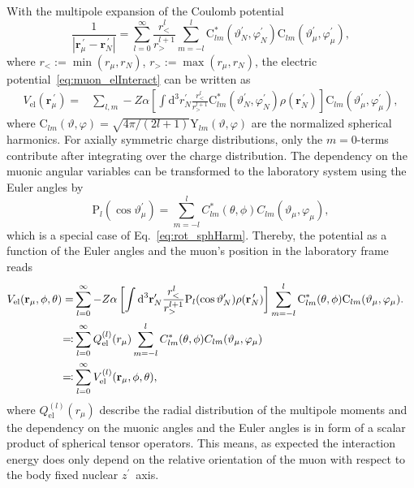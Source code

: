 With the multipole expansion of the Coulomb potential~\cite{jackson1999}
\begin{equation}
\frac{1}{|\mathbf{r}_\mu^{\,\prime}-\mathbf{r}_N^{\,\prime}|}=\sum_{l=0}^\infty \frac{r_<^l}{r_>^{l+1}}\sum_{m=-l}^l  \text{C}^*_{lm}(\vartheta_N^{\prime},\varphi_N^{\prime})\text{C}_{lm}(\vartheta_\mu^\prime,\varphi_\mu^\prime),
\end{equation}
where $r_<:=\min (r_\mu,r_N)$, $r_>:=\max (r_\mu,r_N)$, the electric potential~\eqref{eq:muon_elInteract} can be written as
\begin{align}
V_{\text{el}}(\mathbf{r}_\mu^{\,\prime})=&\sum_{l,m}-Z\alpha \left[ \int \text{d}^3r^{\prime}_N \frac{r_<^l}{r_>^{l+1}}\text{C}^*_{lm}(\vartheta_N^{\prime},\varphi_N^{\prime})\rho(\mathbf{r}_N^{\,\prime})\right]\text{C}_{lm}(\vartheta_\mu^{\prime},\varphi_\mu^\prime),
\end{align}
where ${\text{C}_{lm}(\vartheta,\varphi)}{=}{\sqrt{4\pi/(2l+1)}\text{Y}_{lm}(\vartheta,\varphi)}$ are the normalized spherical harmonics.
For axially symmetric charge distributions, only the ${m}{=}{0}$-terms contribute after integrating over the charge distribution. The dependency on the muonic angular variables can be transformed to the laboratory system using the Euler angles by
\begin{equation}
\text{P}_{l}(\cos\vartheta_\mu^\prime)=
 \sum_{m=-l}^l C^*_{lm}(\theta,\phi)C_{lm}(\vartheta_\mu,\varphi_\mu),
\end{equation}
which is a special case of Eq.~\eqref{eq:rot_sphHarm}.
Thereby, the potential as a function of the Euler angles and the muon's position in the laboratory frame reads
\begin{align}
V_{\text{el}}(\mathbf{r}_\mu,\phi,\theta)=&\sum_{l=0}^\infty-Z\alpha \left[ \int \text{d}^3\mathbf{r}^{\prime}_N \frac{r_<^l}{r_>^{l+1}}\text{P}_{l}(\cos \vartheta_N^{\prime})\rho(\mathbf{r}_N^{\,\prime})\right]\sum_{m=-l}^l \text{C}^*_{lm}(\theta,\phi)\text{C}_{lm}(\vartheta_\mu,\varphi_\mu).\notag\\
\eqqcolon &\sum_{l=0}^\infty Q_{\text{el}}^{(l)}(r_\mu)\sum_{m=-l}^lC^*_{lm}(\theta,\phi)C_{lm}(\vartheta_\mu,\varphi_\mu)&\notag\\
\eqqcolon& \sum_{l=0}^\infty V^{(l)}_{\text{el}}(\mathbf{r}_\mu,\phi,\theta),
\label{eq:defmulti}
\end{align}
where $Q_{\text{el}}^{(l)}(r_\mu)$ describe the radial distribution of the multipole moments and the dependency on the muonic angles and the Euler angles is in form of a scalar product of spherical tensor operators. This means, as expected the interaction energy does only depend on the relative orientation of the muon with respect to the body fixed nuclear $z^\prime$~axis.

